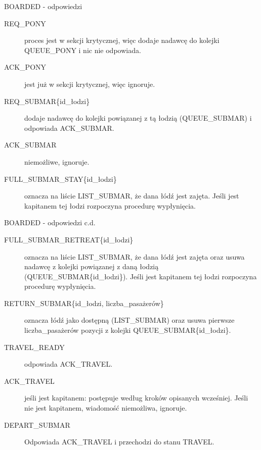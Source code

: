\documentclass{beamer}
\begin{document}
\begin{frame}{BOARDED - odpowiedzi}
    \internallinenumbers
    \resetlinenumber[1]
    \begin{description}
        \item [REQ\_PONY] proces jest w sekcji krytycznej, więc dodaje nadawcę do kolejki QUEUE\_PONY i nic nie odpowiada. 
        \item [ACK\_PONY] jest już w sekcji krytycznej, więc ignoruje.
        \item [REQ\_SUBMAR\{id\_łodzi\}] dodaje nadawcę do kolejki powiązanej z tą łodzią (QUEUE\_SUBMAR) i odpowiada ACK\_SUBMAR.
        \item [ACK\_SUBMAR] niemożliwe, ignoruje.
        \item [FULL\_SUBMAR\_STAY\{id\_łodzi\}] oznacza na liście LIST\_SUBMAR, że dana łódź jest zajęta. Jeśli jest kapitanem tej łodzi rozpoczyna procedurę wypłynięcia.

    \end{description}
\end{frame}

\begin{frame}{BOARDED - odpowiedzi c.d.}
    \internallinenumbers
    \resetlinenumber[1]
    \begin{description}
        \item [FULL\_SUBMAR\_RETREAT\{id\_łodzi\}] oznacza na liście LIST\_SUBMAR, że dana łódź jest zajęta oraz usuwa nadawcę z kolejki powiązanej z daną łodzią (QUEUE\_SUBMAR\{id\_łodzi\}). Jeśli jest kapitanem tej łodzi rozpoczyna procedurę wypłynięcia.
        \item [RETURN\_SUBMAR\{id\_łodzi, liczba\_pasażerów\}] oznacza łódź jako dostępną (LIST\_SUBMAR) oraz usuwa pierwsze liczba\_pasażerów pozycji z kolejki QUEUE\_SUBMAR\{id\_łodzi\}.
        \item [TRAVEL\_READY] odpowiada ACK\_TRAVEL.
        \item [ACK\_TRAVEL] jeśli jest kapitanem: postępuje według kroków opisanych wcześniej. Jeśli nie jest kapitanem, wiadomość niemożliwa, ignoruje.
        \item [DEPART\_SUBMAR] Odpowiada ACK\_TRAVEL i przechodzi do stanu TRAVEL.
    \end{description}
\end{frame}
\end{document}
